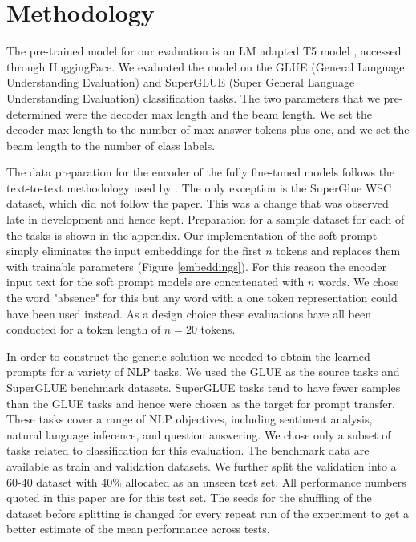 \documentclass[final,6p,times,twocolumn,authoryear]{elsarticle}
\begin{document}
\section{Methodology}
The pre-trained model for our evaluation is an LM adapted T5 model \citep{lester_2021}, accessed through HuggingFace. We evaluated the model on the GLUE (General Language Understanding Evaluation) and SuperGLUE (Super General Language Understanding Evaluation) classification tasks. The two parameters that we pre-determined were the decoder max length and the beam length. We set the decoder max length to the number of max answer tokens plus one, and we set the beam length to the number of class labels.

The data preparation for the encoder of the fully fine-tuned models follows the text-to-text methodology used by \cite{raffel_2022}. The only exception is the SuperGlue WSC dataset, which did not follow the paper. This was a change that was observed late in development and hence kept. Preparation for a sample dataset for each of the tasks is shown in the appendix. Our implementation of the soft prompt simply eliminates the input embeddings for the first $n$ tokens and replaces them with trainable parameters (Figure \ref{embeddings}). For this reason the encoder input text for the soft prompt models are concatenated with $n$ words. We chose the word "absence" for this but any word with a one token representation could have been used instead. As a design choice these evaluations have all been conducted for a token length of $n=20$ tokens.

In order to construct the generic solution we needed to obtain the learned prompts for a variety of NLP tasks. We used the GLUE as the source tasks and SuperGLUE benchmark datasets. SuperGLUE tasks tend to have fewer samples than the GLUE tasks and hence were chosen as the target for prompt transfer.  These tasks cover a range of NLP objectives, including sentiment analysis, natural language inference, and question answering. We chose only a subset of tasks related to classification for this evaluation. The benchmark data are available as train and validation datasets. We further split the validation into a 60-40 dataset with 40\% allocated as an unseen test set. All performance numbers quoted in this paper are for this test set. The seeds for the shuffling of the dataset before splitting is changed for every repeat run of the experiment to get a better estimate of the mean performance across tests.
\end{document}
